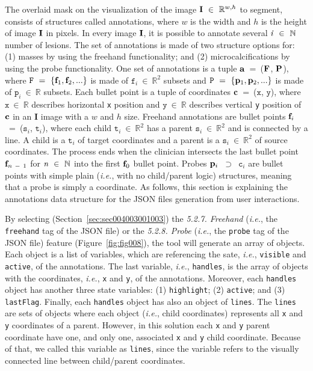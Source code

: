 The overlaid mask on the visualization of the image ${\bf I}~\in~\mathbb{R}^{w, h}$ to segment, consists of structures called annotations, where $w$ is the width and $h$ is the height of image ${\bf I}$ in pixels.
In every image ${\bf I}$, it is possible to annotate several ${\it i}~\in~\mathbb{N}$ number of lesions.
The set of annotations is made of two structure options for: (1) masses by using the freehand functionality; and (2) microcalcifications by using the probe functionality.
One set of annotations is a tuple ${\bf a}$~=~(${\bf F}$, ${\bf P}$), where $\texttt{F}~=~\{{\bf f}_{1}, {\bf f}_{2}, ...\}$ is made of $\texttt{f}_{i}~\in~\mathbb{R}^2$ subsets and $\texttt{P}~=~\{{\bf p}_{1}, {\bf p}_{2}, ...\}$ is made of $\texttt{p}_{i}~\in~\mathbb{R}$ subsets.
Each bullet point is a tuple of coordinates ${\bf c}$~=~($\texttt{x}$, $\texttt{y}$), where $\texttt{x}~\in~\mathbb{R}$ describes horizontal \texttt{x} position and $\texttt{y}~\in~\mathbb{R}$ describes vertical \texttt{y} position of ${\bf c}$ in an {\bf I} image with a $w$ and $h$ size.
Freehand annotations are bullet points ${\bf f}_{i}$~=~($\texttt{s}_{i}$, $\texttt{t}_{i}$), where each child $\texttt{t}_{i}~\in~\mathbb{R}^2$ has a parent $\texttt{s}_{i}~\in~\mathbb{R}^2$ and is connected by a line.
A child is a $\texttt{t}_{i}$ of target coordinates and a parent is a $\texttt{s}_{i}~\in~\mathbb{R}^2$ of source coordinates.
The process ends when the clinician intersects the last bullet point ${\bf f}_{n~-~1}$ for ${\it n}~\in~\mathbb{N}$ into the first ${\bf f}_{0}$ bullet point.
Probes ${\bf p}_{i}$~$\supset$~$\texttt{c}_{i}$ are bullet points with simple plain ({\it i.e.}, with no child/parent logic) structures, meaning that a probe is simply a coordinate.
As follows, this section is explaining the annotations data structure for the \ac{JSON} files generation from user interactions.

By selecting (Section~\ref{sec:sec004003001003}) the {\it 5.2.7. Freehand} ({\it i.e.}, the \texttt{freehand} tag of the \ac{JSON} file) or the {\it 5.2.8. Probe} ({\it i.e.}, the \texttt{probe} tag of the \ac{JSON} file) feature (Figure~\ref{fig:fig008}), the tool will generate an array of objects.
Each object is a list of variables, which are referencing the sate, {\it i.e.}, \texttt{visible} and \texttt{active}, of the annotations.
The last variable, {\it i.e.}, \texttt{handles}, is the array of objects with the coordinates, {\it i.e.}, \texttt{x} and \texttt{y}, of the annotations.
Moreover, each \texttt{handles} object has another three state variables: (1) \texttt{highlight}; (2) \texttt{active}; and (3) \texttt{lastFlag}.
Finally, each \texttt{handles} object has also an object of \texttt{lines}.
The \texttt{lines} are sets of objects where each object ({\it i.e.}, child coordinates) represents all \texttt{x} and \texttt{y} coordinates of a parent.
However, in this solution each \texttt{x} and \texttt{y} parent coordinate have one, and only one, associated \texttt{x} and \texttt{y} child coordinate.
Because of that, we called this variable as \texttt{lines}, since the variable refers to the visually connected line between child/parent coordinates.

